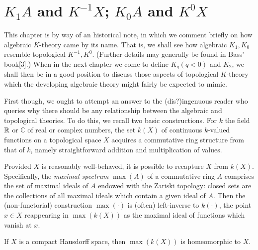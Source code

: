 \chapter{$K_1 A$ and $K^{-1} X$; $K_0A$ and $K^0 X$}
\label{cha:2k_1a_and_k-1x_k0a_and_k0x}

This chapter is by way of an historical note, in which we comment briefly on how algebraic 
$K$-theory came by its name. That is, we shall see how algebraic $K_1,K_0$ resemble topological $K^{-1},K^0$. (Further details may generally be found in Bass' book[3].) When in the next chapter we come to define $K_q(q<0)$ and $K_2$, we shall then be in a good position to discuss those aspects of topological $K$-theory which the developing algebraic theory might fairly be expected to mimic.

First though, we ought to attempt an answer to the (dis?)ingenuous reader who queries why there should be any relationship between the algebraic and topological theories. To do this, we recall two basic constructions. For $k$ the field $\mathbb{R}$ or $\mathbb{C}$ of real or complex numbers, the set $k(X)$ of continuous $k$-valued functions on a topological space $X$ acquires a commutative ring structure from that of $k$, namely straightforward addition and multiplication of values.

Provided $X$ is reasonably well-behaved, it is possible to recapture $X$ from $k(X)$. Specifically, the {\em maximal spectrum} $\max(A)$  of a commutative ring $A$ comprises the set of maximal ideals of $A$ endowed with the Zariski topology: closed sets are the collections of all maximal ideals which contain a given ideal of $A$. Then the (non-functorial) construction $\max(\cdot)$ is (often) left-inverse to $k(\cdot)$, the point $x\in X$ reappearing in $\max(k(X))$ as the maximal ideal of functions which
vanish at $x$.
\begin{prop}
If $X$ is a compact Hausdorff space, then $\max(k(X))$ is homeomorphic to $X$.
\end{prop}

